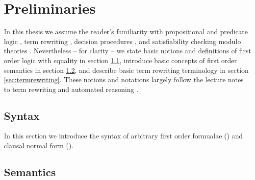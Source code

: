 
\chapter{Preliminaries}

%

In this thesis we assume the reader's familiarity with 
propositional and predicate logic \cite{Huth:2004:LCS:975331}, 
term rewriting \cite{Baader:1998:TR:280474}, 
decision procedures \cite{Kroening:2008:DPA:1391237}, 
and satisfiability checking modulo theories \cite{Biere:2009:HSV:1550723}.
Nevertheless -- for clarity -- we state basic notions and  definitions 
of first order logic with equality in section \ref{sec:syntax},
introduce basic concepts of first order semantics in section \ref{sec:semantics},
and describe basic term rewriting terminology in section \ref{sec:termrewriting}. 
These notions and notations largely follow the lecture notes to term rewriting and automated reasoning \cite{AM2015tr, GM2013ar}.


\section{Syntax}\label{sec:syntax}

In this section we introduce the syntax of arbitrary first order formualae (\FOF) 
and clausal normal form (\CNF).

























\section{Semantics}\label{sec:semantics}

